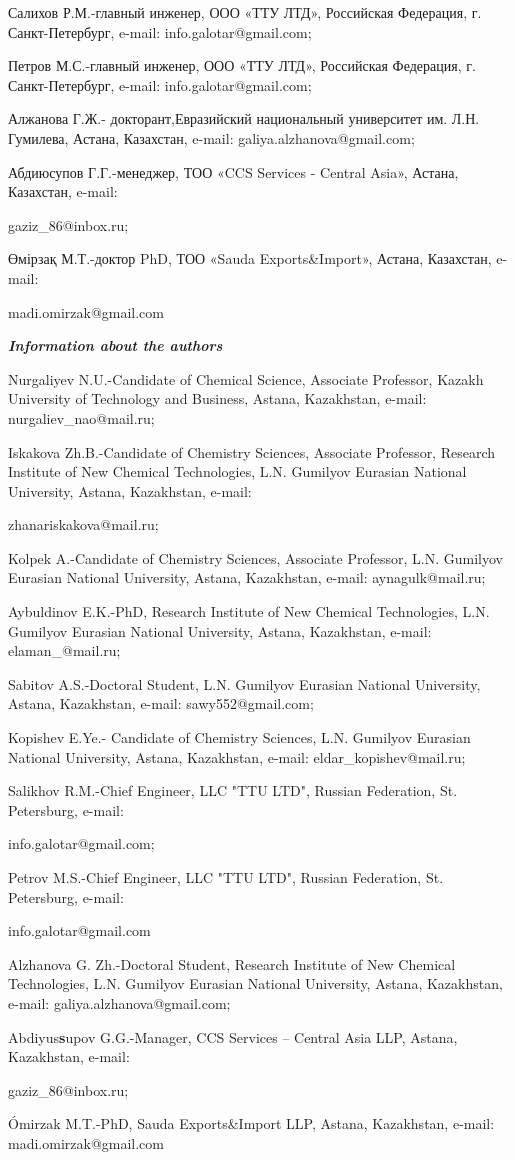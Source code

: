 \begin{noparindent}
Салихов Р.М.-главный инженер, ООО «ТТУ ЛТД», Российская Федерация, г.
Санкт-Петербург, e-mail: info.galotar@gmail.com;

Петров М.С.-главный инженер, ООО «ТТУ ЛТД», Российская Федерация, г.
Санкт-Петербург, e-mail: info.galotar@gmail.com;

Алжанова Г.Ж.- докторант,Евразийский национальный университет им. Л.Н.
Гумилева, Астана, Казахстан, e-mail: galiya.alzhanova@gmail.com;

Абдиюсупов Г.Г.-менеджер, ТОО «CCS Services - Central Asia», Астана,
Казахстан, e-mail:

gaziz\_86@inbox.ru;

Өмірзақ М.Т.-доктор PhD, ТОО «Sauda Exports\&Import»,
Астана, Казахстан, e-mail:

madi.omirzak@gmail.com
\end{noparindent}

\emph{{\bfseries Information about the authors}}

\begin{noparindent}
Nurgaliyev N.U.-Candidate of Chemical Science, Associate Professor,
Kazakh University of Technology and Business, Astana, Kazakhstan,
e-mail: nurgaliev\_nao@mail.ru;

Iskakova Zh.B.-Candidate of Chemistry Sciences, Associate Professor,
Research Institute of New Chemical Technologies, L.N. Gumilyov Eurasian
National University, Astana, Kazakhstan, e-mail:

zhanariskakova@mail.ru;

Kolpek A.-Candidate of Chemistry Sciences, Associate Professor, L.N.
Gumilyov Eurasian National University, Astana, Kazakhstan, e-mail:
aynagulk@mail.ru;

Aybuldinov E.K.-PhD, Research Institute of New Chemical Technologies,
L.N. Gumilyov Eurasian National University, Astana, Kazakhstan, e-mail:
elaman\_@mail.ru;

Sabitov A.S.-Doctoral Student, L.N. Gumilyov Eurasian National
University, Astana, Kazakhstan, e-mail: sawy552@gmail.com;

Kopishev E.Ye.- Candidate of Chemistry Sciences, L.N. Gumilyov Eurasian
National University, Astana, Kazakhstan, e-mail:
eldar\_kopishev@mail.ru;

Salikhov R.M.-Chief Engineer, LLC "TTU LTD", Russian Federation, St.
Petersburg, e-mail:

info.galotar@gmail.com;

Petrov M.S.-Chief Engineer, LLC "TTU LTD", Russian Federation, St.
Petersburg, e-mail:

info.galotar@gmail.com

Alzhanova G. Zh.-Doctoral Student, Research Institute of New Chemical
Technologies, L.N. Gumilyov Eurasian National University, Astana,
Kazakhstan, e-mail: galiya.alzhanova@gmail.com;

Abdiyus{\bfseries s}upov G.G.-Manager, CCS Services -- Central Asia LLP,
Astana, Kazakhstan, e-mail:

gaziz\_86@inbox.ru;

Ómirzak M.T.-PhD, Sauda Exports\&Import LLP, Astana, Kazakhstan, e-mail:
madi.omirzak@gmail.com
\end{noparindent}
